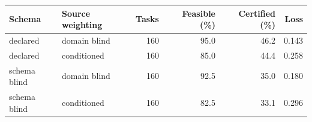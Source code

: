 \begin{tabular}{llrrrr}
\toprule
Schema & Source weighting & Tasks & Feasible (\%) & Certified (\%) & Loss \\
\midrule
declared & domain blind & 160 & 95.0 & 46.2 & 0.143 \\
declared & conditioned & 160 & 85.0 & 44.4 & 0.258 \\
schema blind & domain blind & 160 & 92.5 & 35.0 & 0.180 \\
schema blind & conditioned & 160 & 82.5 & 33.1 & 0.296 \\
\bottomrule
\end{tabular}
